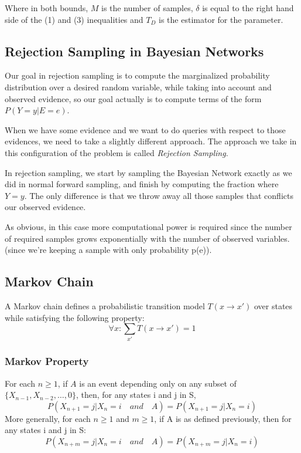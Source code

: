 \documentclass{article}
\begin{document}
    Where in both bounds, $M$ is the number of samples, $\delta$ is equal to the right hand side of the (1) and (3) inequalities and $T_D$ is the estimator for the parameter.


\subsection{Rejection Sampling in Bayesian Networks}
    Our goal in rejection sampling is to compute the marginalized probability distribution over a desired random variable, while taking into account and observed evidence, so our goal actually is to compute terms of the form $P(Y=y | E=e)$.

    When we have some evidence and we want to do queries with respect to those evidences, we need to take a slightly different approach. The approach we take in this configuration of the problem is called \textit{Rejection Sampling}.
    
    In rejection sampling, we start by sampling the Bayesian Network exactly as we did in normal forward sampling, and finish by computing the fraction where $Y=y$. The only difference is that we throw away all those samples that conflicts our observed evidence.
    
    As obvious, in this case more computational power is required since the number of required samples grows exponentially with the number of observed variables. (since we're keeping a sample with only probability p(e)).

\subsection{Markov Chain}

A Markov chain defines a probabilistic transition model $T(x \rightarrow x')$ over states while satisfying the following property:
$$ \forall x: \sum_{x'} T(x \rightarrow x') = 1$$

\subsubsection{Markov Property}
    For each $n \geq 1$, if $A$ is an event depending only on any subset of $\{ X_{n-1}, X_{n-2}, \ldots, 0\}$, then, for any states i and j in S,
    $$ P(X_{n+1}=j|X_n=i \quad and \quad A) = P(X_{n+1} = j| X_n=i)$$
    More generally, for each $n \geq 1$ and $m \geq 1$, if A is as defined previously, then for any states i and j in S:
    $$ P(X_{n+m}=j|X_n=i \quad and \quad A) = P(X_{n+m}=j|X_n=i)$$
\end{document}
